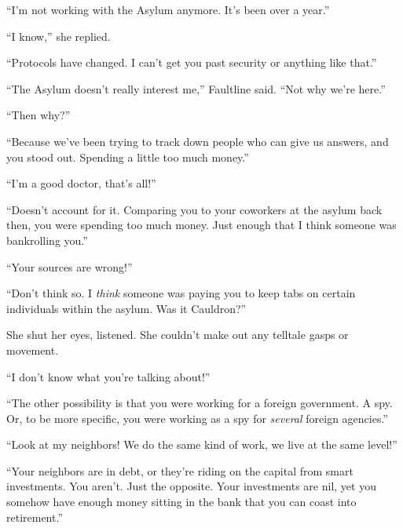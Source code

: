 ``I'm not working with the Asylum anymore.  It's been over a year.''



``I know,'' she replied.



``Protocols have changed.  I can't get you past security or anything like that.''



``The Asylum doesn't really interest me,'' Faultline said.  ``Not why we're here.''



``Then why?''



``Because we've been trying to track down people who can give us answers, and you stood out.  Spending a little too much money.''



``I'm a good doctor, that's all!''



``Doesn't account for it.  Comparing you to your coworkers at the asylum back then, you were spending too much money.  Just enough that I think someone was bankrolling you.''



``Your sources are wrong!''



``Don't think so.  I \emph{think} someone was paying you to keep tabs on certain individuals within the asylum.  Was it Cauldron?''



She shut her eyes, listened.  She couldn't make out any telltale gasps or movement.



``I don't know what you're talking about!''



``The other possibility is that you were working for a foreign government.  A spy.  Or, to be more specific, you were working as a spy for \emph{several} foreign agencies.''



``Look at my neighbors!  We do the same kind of work, we live at the same level!''



``Your neighbors are in debt, or they're riding on the capital from smart investments.  You aren't.  Just the opposite.  Your investments are nil, yet you somehow have enough money sitting in the bank that you can coast into retirement.''



